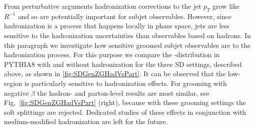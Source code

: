 From perturbative arguments hadronization corrections to the jet $p_{T}$ grow like $R^{-1}$ \cite{Dasgupta:2007wa} and
so are potentially important for subjet observables.
However, since hadronization is a process that happens locally in phase space, jets are less sensitive to the hadronization uncertainties than observables based on hadrons. In this paragraph we investigate how sensitive groomed subjet observables are to the hadronization process. For this purpose we compare the \zg-distribution in PYTHIA8 with and without hadronization for the three SD settings, described above, as shown in \autoref{fig:SDGenZGHadVsPart}. It can be observed that the low-\zg\, region is particularly sensitive to hadronization effects. For grooming with negative $\beta$ the hadron- and parton-level results are most similar, see Fig,~\ref{fig:SDGenZGHadVsPart} (right), because with these grooming settings the soft splittings are rejected. Dedicated studies of these effects in conjunction with medium-modified hadronization are left for the future.


